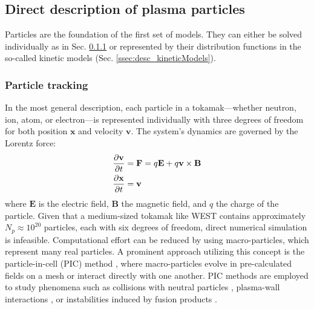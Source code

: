 \subsection{Direct description of plasma particles}
\label{sec:desc_directDesciption}
Particles are the foundation of the first set of models. They can either be solved individually as in Sec. \ref{ssec:desc_particleTracking} or represented by their distribution functions in the so-called kinetic models (Sec. \ref{ssec:desc_kineticModels}).

\subsubsection{Particle tracking}
\label{ssec:desc_particleTracking}
In the most general description, each particle in a tokamak—whether neutron, ion, atom, or electron—is represented individually with three degrees of freedom for both position $\mathbf{x}$ and velocity $\mathbf{v}$. The system's dynamics are governed by the Lorentz force:
\begin{align}
	\pdv{\mathbf{v}}{t} &= \mathbf{F} = q\mathbf{E} + q\mathbf{v} \times \mathbf{B} \label{eq:desc_particle}\\
	\pdv{\mathbf{x}}{t} &= \mathbf{v}
\end{align}
where $\mathbf{E}$ is the electric field, $\mathbf{B}$ the magnetic field, and $q$ the charge of the particle. \newline
Given that a medium-sized tokamak like WEST contains approximately $N_p \approx 10^{20}$ particles, each with six degrees of freedom, direct numerical simulation is infeasible. Computational effort can be reduced by using macro-particles, which represent many real particles. A prominent approach utilizing this concept is the particle-in-cell (PIC) method \cite{tskhakaya2007particle}, where macro-particles evolve in pre-calculated fields on a mesh or interact directly with one another. PIC methods are employed to study phenomena such as collisions with neutral particles \cite{birdsall1991particle}, plasma-wall interactions \cite{khaziev2018hpic}, or instabilities induced by fusion products \cite{cook2013particle}.



